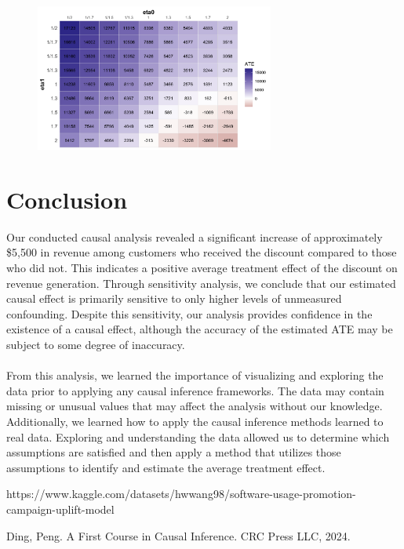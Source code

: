 \documentclass{article}
\begin{document}
\begin{figure}[H]
  \centering
  \includegraphics[width = 0.7\textwidth]{figs/sens_heatmap.png}
\end{figure}

\section{Conclusion}
Our conducted causal analysis revealed a significant increase of approximately \$5,500 in revenue among customers who received the discount compared to those who did not. This indicates a positive average treatment effect of the discount on revenue generation. Through sensitivity analysis, we conclude that our estimated causal effect is primarily sensitive to only higher levels of unmeasured confounding. Despite this sensitivity, our analysis provides confidence in the existence of a causal effect, although the accuracy of the estimated ATE may be subject to some degree of inaccuracy.\\
\\
From this analysis, we learned the importance of visualizing and exploring the data prior to applying any causal inference frameworks. The data may contain missing or unusual values that may affect the analysis without our knowledge. Additionally, we learned how to apply the causal inference methods learned to real data. Exploring and understanding the data allowed us to determine which assumptions are satisfied and then apply a method that utilizes those assumptions to identify and estimate the average treatment effect. 

\begin{thebibliography}{8}
https://www.kaggle.com/datasets/hwwang98/software-usage-promotion-campaign-uplift-model

Ding, Peng. A First Course in Causal Inference. CRC Press LLC, 2024. 
\end{thebibliography}
\end{document}
